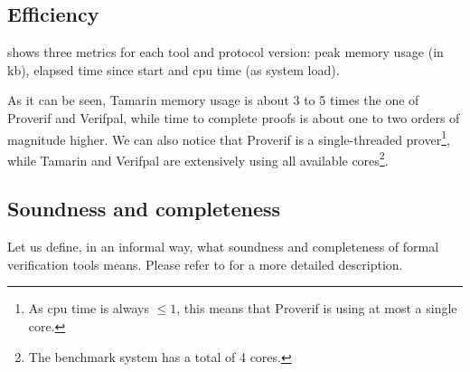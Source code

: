 \begin{table}[!ht]
    \renewcommand{\arraystretch}{1.5}
    \setlength\arrayrulewidth{1pt}
    \caption{Expressiveness of tools.}
    \label{tbl:expressiveness}
\end{table}

\subsection{Efficiency}
 shows three metrics for each tool and protocol version: peak memory usage (in kb), elapsed time since start and cpu time (as system load).

As it can be seen, Tamarin memory usage is about 3 to 5 times the one of Proverif and Verifpal, while time to complete proofs is about one to two orders of magnitude higher. We can also notice that Proverif is a single-threaded prover\footnote{As cpu time is always $\leq 1$, this means that Proverif is using at most a single core.}, while Tamarin and Verifpal are extensively using all available cores\footnote{The benchmark system has a total of 4 cores.}.




\newpage
\subsection{Soundness and completeness}

Let us define, in an informal way, what soundness and completeness of formal verification tools means. Please refer to \cite{Furer89oncompleteness} for a more detailed description.

